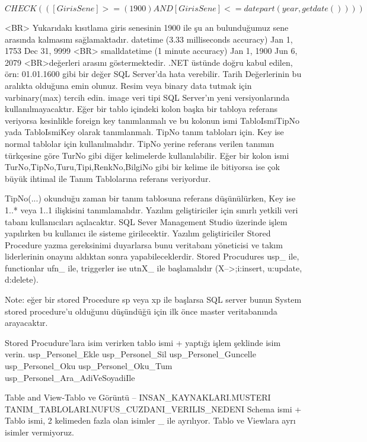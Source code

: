 \documentclass[10pt,a4paper]{article}
\begin{document}
  $  CHECK  (([GirisSene]>=(1900) AND   [GirisSene]<=datepart(year,getdate()))) $
  
  			 <BR>			Yukarıdakı kısıtlama 
  giris senesinin 1900 ile şu an bulunduğumuz sene arasında kalmasını 
  sağlamaktadır.								 
  				datetime (3.33 milliseconds accuracy)  	Jan 1, 1753  	Dec 31, 9999
  				 <BR>				smalldatetime (1 minute accuracy) 	Jan 1, 1900 	Jun 6, 2079		
  				 <BR>değerleri arasını göstermektedir. .NET üstünde doğru kabul edilen, 
  örn: 01.01.1600 gibi bir değer SQL Server'da				hata verebilir. Tarih 
  Değerlerinin bu aralıkta olduğuna emin olunuz.						 
  			Resim veya binary data tutmak için varbinary(max) tercih edin. image 
  veri tipi SQL Server'ın yeni versiyonlarında			kullanılmayacaktır.		 
  			Eğer bir tablo içindeki kolon başka bir tabloya referans veriyorsa 
  kesinlikle foreign key tanımlanmalı ve bu			kolonun ismi TabloIsmiTipNo yada 
  TabloIsmiKey olarak tanımlanmalı. TipNo tanım tabloları için. Key ise normal 
  tablolar			için kullanılmalıdır.	
    TipNo yerine referans verilen tanımın türkçesine göre TurNo
    gibi diğer kelimelerde kullanılabilir.
    Eğer bir kolon ismi TurNo,TipNo,Turu,Tipi,RenkNo,BilgiNo
    gibi bir kelime ile bitiyorsa ise çok büyük ihtimal ile
    Tanım Tablolarına referans veriyordur.
    

  
  			TipNo(...) okunduğu zaman bir tanım tablosuna referans düşünülürken, Key ise 
  1..* veya 1..1 ilişkisini tanımlamalıdır.		 
  			Yazılım geliştiriciler için sınırlı yetkili veri tabanı kullanıcıları 
  açılacaktır. SQL Sever Management Studio üzerinde işlem			yapılırken bu 
  kullanıcı ile sisteme girilecektir.		 
  			Yazılım geliştiriciler Stored Procedure yazma gereksinimi duyarlarsa 
  bunu veritabanı yöneticisi ve takım liderlerinin onayını			 aldıktan sonra 
  yapabileceklerdir.		 
  			Stored Procudures usp\_ ile, functionlar ufn\_ ile, triggerler ise 
  utnX\_ ile başlamalıdır (X-->;i:insert, u:update, d:delete). 			
  
  
  Note: eğer bir 
  stored Procedure sp veya xp ile başlarsa SQL server 			bunun System stored 
  procedure'u olduğunu düşündüğü için ilk önce master veritabanında arayacaktır. 
  
  
  Stored Procudure'lara isim verirken tablo ismi + yaptığı işlem şeklinde 
  isim verin.
		usp\_Personel\_Ekle			usp\_Personel\_Sil			 
		usp\_Personel\_Guncelle		usp\_Personel\_Oku			 
		usp\_Personel\_Oku\_Tum		usp\_Personel\_Ara\_AdiVeSoyadiIle
  
     Table and View-Tablo ve Görüntü 
     -- 
    INSAN\_KAYNAKLARI.MUSTERI 
      			TANIM\_TABLOLARI.NUFUS\_CUZDANI\_VERILIS\_NEDENI 
    Schema ismi + Tablo ismi, 2 kelimeden fazla olan isimler \_ ile 
      ayrılıyor. Tablo ve Viewlara ayrı isimler vermiyoruz.		  
  
\end{document}

